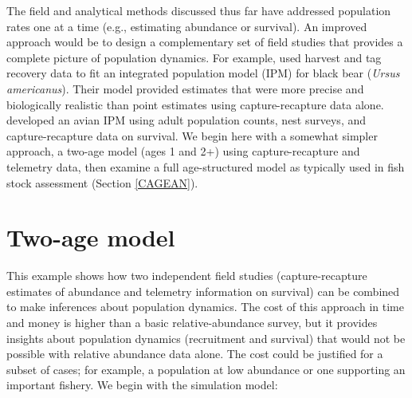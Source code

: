 \documentclass[
]{krantz}
\begin{document}
The field and analytical methods discussed thus far have addressed population rates one at a time (e.g., estimating abundance or survival). An improved approach would be to design a complementary set of field studies that provides a complete picture of population dynamics. For example, \citet{conn.etal_2008} used harvest and tag recovery data to fit an integrated population model (IPM) for black bear (\emph{Ursus americanus}). Their model provided estimates that were more precise and biologically realistic than point estimates using capture-recapture data alone. \citet{kéry.schaub_2012} developed an avian IPM using adult population counts, nest surveys, and capture-recapture data on survival. We begin here with a somewhat simpler approach, a two-age model (ages 1 and 2+) using capture-recapture and telemetry data, then examine a full age-structured model as typically used in fish stock assessment (Section \ref{CAGEAN}).

\hypertarget{TwoAge}{%
\section{Two-age model}\label{TwoAge}}

This example shows how two independent field studies (capture-recapture estimates of abundance and telemetry information on survival) can be combined to make inferences about population dynamics. The cost of this approach in time and money is higher than a basic relative-abundance survey, but it provides insights about population dynamics (recruitment and survival) that would not be possible with relative abundance data alone. The cost could be justified for a subset of cases; for example, a population at low abundance or one supporting an important fishery. We begin with the simulation model:
\end{document}
